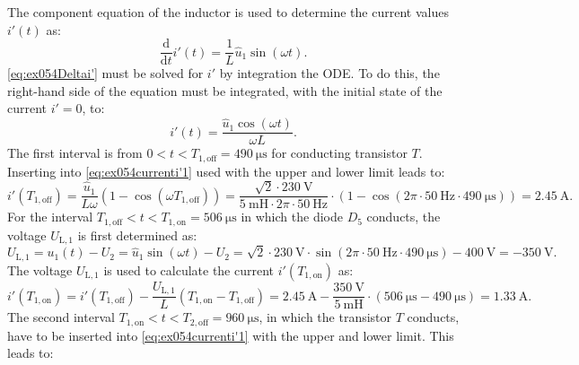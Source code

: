 
\begin{solutionblock}
    The component equation of the inductor is used to determine the current values $i'(t)$ as:
    \begin{equation}
        \frac{\mathrm{d}}{\mathrm{d}t}i'(t) = \frac{1}{L}\hat u_\mathrm{1} \sin(\omega t).\label{eq:ex054Deltai'}
    \end{equation}
    \eqref{eq:ex054Deltai'} must be solved for $i'$ by integration the ODE. To do this, the right-hand side of the equation must be integrated, with the initial state of the current $i'= 0$, to:
    \begin{equation}
        i'(t)=\frac{\hat u_\mathrm{1} \cos(\omega t)}{\omega L}.\label{eq:ex054currenti'1}
    \end{equation}
    The first interval is from $0 < t < T_\mathrm{1,off} = \SI{490}{\micro\s}$ for conducting transistor $T$. Inserting into \eqref{eq:ex054currenti'1} used with the upper and lower limit leads to:
    \begin{equation}
        i'(T_\mathrm{1,off}) = \frac{\hat u_\mathrm{1}}{L \omega}(1- \cos(\omega T_\mathrm{1,off})) = \frac{\sqrt{2}\cdot\SI{230}{\volt}}{\SI{5}{\milli\henry}\cdot 2\pi \cdot \SI{50}{\hertz}}\cdot (1-\cos(2\pi \cdot \SI{50}{\hertz} \cdot \SI{490}{\micro\s})) = \SI{2.45}{\ampere}.
    \end{equation}
    For the interval $T_\mathrm{1,off} < t < T_\mathrm{1,on} = \SI{506}{\micro\s}$ in which the diode $D_\mathrm{5}$ conducts, the voltage $U_\mathrm{L,1}$ is first determined as:
    \begin{equation}
        U_\mathrm{L,1} = u_\mathrm{1}(t) - U_\mathrm{2}= \hat u_\mathrm{1} \sin(\omega t) - U_\mathrm{2} = \sqrt{2} \cdot \SI{230}{\volt} \cdot \sin(2\pi \cdot \SI{50}{\hertz}\cdot \SI{490}{\micro\s}) - \SI{400}{\volt} = -\SI{350}{\volt}.
    \end{equation}
    The voltage $U_\mathrm{L,1}$ is used to calculate the current  $i'(T_\mathrm{1,on})$ as:
    \begin{equation}
        i'(T_\mathrm{1,on}) = i'(T_\mathrm{1,off}) -\frac{ U_\mathrm{L,1}}{L}(T_\mathrm{1,on}-T_\mathrm{1,off}) = \SI{2.45}{\ampere} -\frac{\SI{350}{\volt}}{\SI{5}{\milli\henry}}\cdot (\SI{506}{\micro\s}-\SI{490}{\micro\s}) = \SI{1.33}{\ampere}.
    \end{equation}
     The second interval  $T_\mathrm{1,on} < t < T_\mathrm{2,off}  = \SI{960}{\micro\s}$, in which the transistor $T$ conducts, have to be inserted  into \eqref{eq:ex054currenti'1} with the upper and lower limit. This leads to:

\end{solutionblock}
